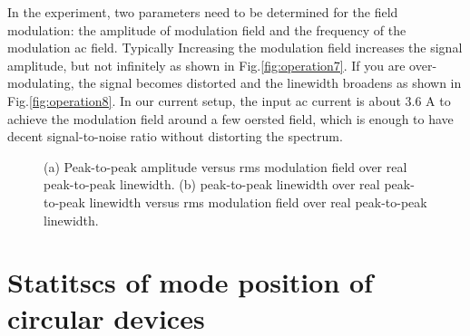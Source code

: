 In the experiment, two parameters need to be determined for the field modulation: the amplitude of modulation field and the frequency of the modulation ac field. Typically Increasing the modulation field increases the signal amplitude, but not infinitely as shown in Fig.\ref{fig:operation7}. If you are over-modulating, the signal becomes distorted and the linewidth broadens as shown in Fig.\ref{fig:operation8}. In our current setup, the input ac current is about 3.6 A to achieve the modulation field around a few oersted field, which is enough to have decent signal-to-noise ratio without distorting the spectrum.


\begin{figure}[h]
\centering
{}
\caption{(a) Peak-to-peak amplitude versus rms modulation field over real peak-to-peak linewidth. (b) peak-to-peak linewidth over real peak-to-peak linewidth versus rms modulation field over real peak-to-peak linewidth.}
\end{figure}


\clearpage




\section{Statitscs of mode position of circular devices}




